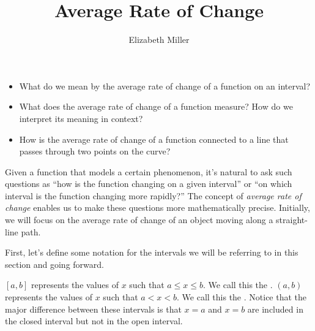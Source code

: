 \documentclass[nooutcomes]{ximera}
\author{Elizabeth Miller}
\title{Average Rate of Change}
\begin{document}
\licenseAPC
\begin{abstract}
  
\end{abstract}
\maketitle



\begin{motivatingQuestions}\begin{itemize}
\item What do we mean by the average rate of change of a function on an interval?
\item What does the average rate of change of a function measure?  How do we interpret its meaning in context?
\item How is the average rate of change of a function connected to a line that passes through two points on the curve?
\end{itemize}\end{motivatingQuestions}



Given a function that models a certain phenomenon, it's natural to ask such questions as ``how is the function changing on a given interval'' or ``on which interval is the function changing more rapidly?'' The concept of \emph{average rate of change} enables us to make these questions more mathematically precise. Initially, we will focus on the average rate of change of an object moving along a straight-line path.

First, let's define some notation for the intervals we will be referring to in this section and going forward.

\begin{definition}
$[a, b]$ represents the values of $x$ such that $a \leq x \leq b$.  We call this the .
$(a, b)$ represents the values of $x$ such that $a < x < b$.  We call this the .
Notice that the major difference between these intervals is that $x=a$ and $x=b$ are included in the closed interval but not in the open interval.
\end{definition}
\end{document}
